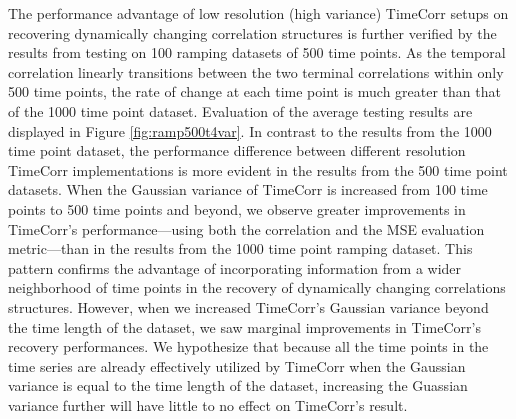 \documentclass[11pt]{article}
\begin{document}
The performance advantage of low resolution (high variance) TimeCorr setups on recovering dynamically changing correlation structures is further verified by the results from testing on 100 ramping datasets of 500 time points. As the temporal correlation linearly transitions between the two terminal correlations within only 500 time points, the rate of change at each time point is much greater than that of the 1000 time point dataset. Evaluation of the average testing results are displayed in Figure \ref{fig:ramp500t4var}. In contrast to the results from the 1000 time point dataset, the performance difference between different resolution TimeCorr implementations is more evident in the results from the 500 time point datasets. When the Gaussian variance of TimeCorr is increased from 100 time points to 500 time points and beyond, we observe greater improvements in TimeCorr's performance---using both the correlation and the MSE evaluation metric---than in the results from the 1000 time point ramping dataset. This pattern confirms the advantage of incorporating information from a wider neighborhood of time points in the recovery of dynamically changing correlations structures. However, when we increased TimeCorr's Gaussian variance beyond the time length of the dataset, we saw marginal improvements in TimeCorr's recovery performances. We hypothesize that because all the time points in the time series are already effectively utilized by TimeCorr when the Gaussian variance is equal to the time length of the dataset, increasing the Guassian variance further will have little to no effect on TimeCorr's result.
\end{document}
